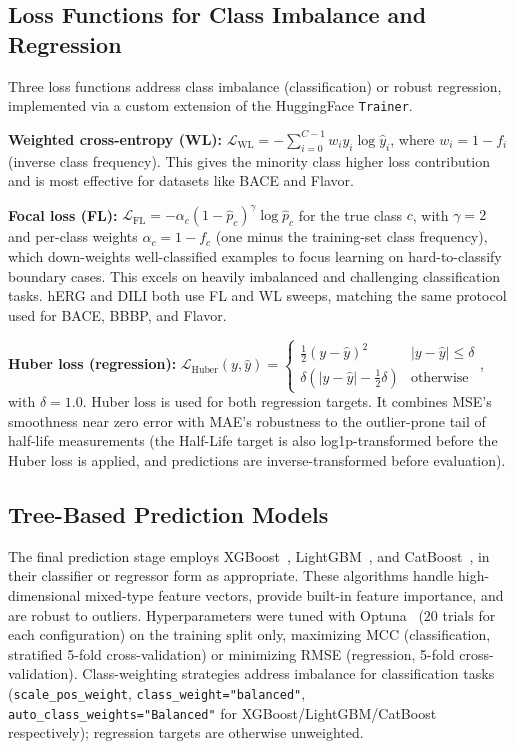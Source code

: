 \documentclass[pdflatex,sn-mathphys-num,Numbered]{sn-jnl}%
\begin{document}
\subsection{Loss Functions for Class Imbalance and Regression}\label{sec:loss_functions}
Three loss functions address class imbalance (classification) or robust regression, implemented via a custom extension of the HuggingFace \texttt{Trainer}.

\noindent \textbf{Weighted cross-entropy (WL):} $\mathcal{L}_{\text{WL}} = -\sum_{i=0}^{C-1} w_i y_i \log\hat{y}_i$, where $w_i = 1 - f_i$ (inverse class frequency). This gives the minority class higher loss contribution and is most effective for datasets like BACE and Flavor.

\noindent\textbf{Focal loss (FL):} $\mathcal{L}_{\text{FL}} = -\alpha_c (1 - \hat{p}_c)^\gamma \log\hat{p}_c$ for the true class $c$, with $\gamma = 2$ and per-class weights $\alpha_c = 1 - f_c$ (one minus the training-set class frequency), which down-weights well-classified examples to focus learning on hard-to-classify boundary cases. This excels on heavily imbalanced and challenging classification tasks. hERG and DILI both use FL and WL sweeps, matching the same protocol used for BACE, BBBP, and Flavor.

\noindent\textbf{Huber loss (regression):} $\mathcal{L}_{\text{Huber}}(y, \hat y) = \begin{cases}\tfrac{1}{2}(y-\hat y)^2 & |y - \hat y| \le \delta \\ \delta(|y-\hat y| - \tfrac12 \delta) & \text{otherwise}\end{cases}$, with $\delta = 1.0$. Huber loss is used for both regression targets. It combines MSE's smoothness near zero error with MAE's robustness to the outlier-prone tail of half-life measurements (the Half-Life target is also log1p-transformed before the Huber loss is applied, and predictions are inverse-transformed before evaluation).

\subsection{Tree-Based Prediction Models}\label{sec:tree_models}
The final prediction stage employs XGBoost~\cite{chen2016xgboost}, LightGBM~\cite{ke2017lightgbm}, and CatBoost~\cite{prokhorenkova2018catboost}, in their classifier or regressor form as appropriate. These algorithms handle high-dimensional mixed-type feature vectors, provide built-in feature importance, and are robust to outliers. Hyperparameters were tuned with Optuna~\cite{akiba2019optuna} ($20$ trials for each configuration) on the training split only, maximizing MCC (classification, stratified 5-fold cross-validation) or minimizing RMSE (regression, 5-fold cross-validation). Class-weighting strategies address imbalance for classification tasks (\texttt{scale\_pos\_weight}, \texttt{class\_weight="balanced"}, \texttt{auto\_class\_weights="Balanced"} for XGBoost/LightGBM/CatBoost respectively); regression targets are otherwise unweighted.
\end{document}
